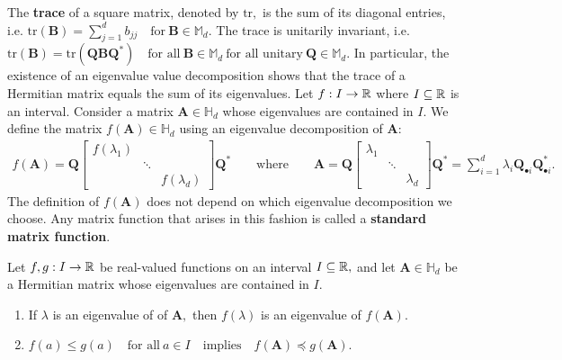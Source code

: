  The \textbf{trace} of a square matrix, denoted by $\mathrm{tr},$
  is the sum of its diagonal entries, i.e. 
  $
    \mathrm{tr}(\mathbf{B})
    =
    \sum_{j=1}^{d}b_{jj}
    \quad 
    \text{for}\ 
    \mathbf{B} \in \mathbb{M}_d.
  $
  The trace is unitarily invariant, i.e.
  $
    \mathrm{tr}(\mathbf{B})
    =
    \mathrm{tr}(\mathbf{Q}\mathbf{B}\mathbf{Q}^*)
    \quad 
    \text{for all}
    \ 
    \mathbf{B}\in \mathbb{M}_d
    \ 
    \text{for all unitary}\ 
    \mathbf{Q} \in \mathbb{M}_d.
  $
  In particular, the existence of an eigenvalue value decomposition shows 
  that the trace of a Hermitian matrix equals the sum of its  eigenvalues.
  Let
  $
  f: I\to \mathbb{R}
  $
  where 
  $I\subseteq\mathbb{R}$ 
  is an interval.
  Consider a matrix 
  $\mathbf{A}\in \mathbb{H}_d$
  whose eigenvalues are contained in $I.$
  We define the matrix 
  $
    f(\mathbf{A})\in \mathbb{H}_d
  $
  using an eigenvalue decomposition of $\mathbf{A}:$
  \begin{gather}
    f(\mathbf{A})
    =
    \mathbf{Q}
    \begin{bmatrix}
      f(\lambda_1) &&\\
                   &\ddots&\\
                   && f(\lambda_d)
    \end{bmatrix}
    \mathbf{Q}^*
    \qquad
    \text{where}
    \qquad
    \mathbf{A}
    =
    \mathbf{Q}
    \begin{bmatrix}
      \lambda_1 &&\\
                   &\ddots&\\
                   && \lambda_d
    \end{bmatrix}
    \mathbf{Q}^*
    =
    \sum_{i=1}^{d} 
    \lambda_i
    \mathbf{Q}_{\bullet i}
    \mathbf{Q}_{\bullet i}^*
    .
  \end{gather}
  The definition of $f(\mathbf{A})$ does not depend on which 
  eigenvalue decomposition we choose.
  Any matrix function that arises in this fashion is called a \textbf{standard matrix function}.


\begin{proposition}
  Let
  $
  f,g: I\to \mathbb{R}
  $
  be real-valued functions on an interval $I\subseteq\mathbb{R},$ 
  and let
  $\mathbf{A}\in \mathbb{H}_d$
  be a Hermitian matrix
  whose eigenvalues are contained in $I.$

  \begin{enumerate}[label={(\roman*)}]
    \item
      If $\lambda$ is an eigenvalue of of $\mathbf{A},$
      then $f(\lambda)$ is an eigenvalue of $f(\mathbf{A}).$
    \item
      $
        f(a)
        \le
        g(a)
        \quad
        \text{for all}\ 
        a\in I
        \quad
        \text{implies}
        \quad
        f(\mathbf{A})
        \preccurlyeq
        g(\mathbf{A})
        .
      $
  \end{enumerate}
\end{proposition}


